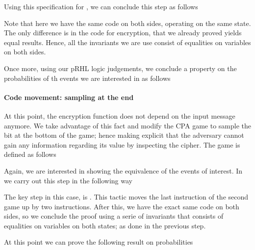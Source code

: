 Using this specification for , we can conclude this step as
follows

Note that here we have the same code on both sides, operating on the
same state. The only difference is in the code for encryption, that we
already proved yields equal results. Hence, all the invariants we are
use consist of equalities on variables on both sides. 

Once more, using our pRHL logic judgements, we conclude a property on
the probabilities of th events we are interested in as follows






\paragraph{Code movement: sampling  at the end}
At this point, the encryption function does not depend on the input
message anymore. We take advantage of this fact and modify the CPA
game to sample the bit  at the bottom of the game; hence making
explicit that the adversary cannot gain any information regarding its
value by inspecting the cipher. The  game is defined as
follows

Again, we are interested in showing the equivalence of the events of
interest. In \EC we carry out this step in the following way

The key step in this case, is . This tactic moves the
last instruction of the second game  %
up by two instructions. After this, we have the exact same code on
both sides, so we conclude the proof using a serie of invariants that
consists of equalities on variables on both states; as done in the
previous step. 

At this point we can prove the following result on probabilities

